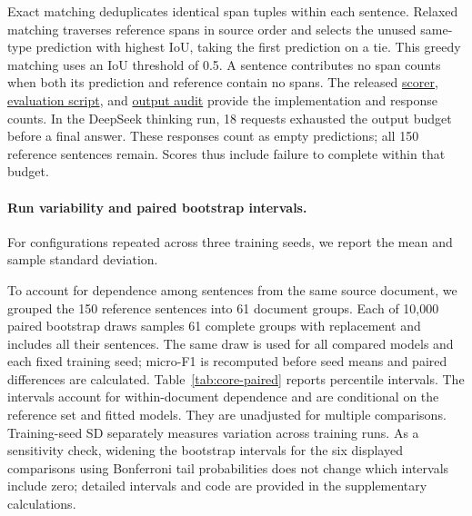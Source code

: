 Exact matching deduplicates identical span tuples within each sentence. Relaxed matching traverses reference spans in source order and selects the unused same-type prediction with highest IoU, taking the first prediction on a tie. This greedy matching uses an IoU threshold of 0.5. A sentence contributes no span counts when both its prediction and reference contain no spans. The released \href{https://github.com/AlfredJamesLi/chinese-skillspan-benchmark/blob/e3f0aa87f65cdfcb399b0c9f305bb7666a76d3b6/scorer/score_lskt.py}{scorer}, \href{https://github.com/AlfredJamesLi/chinese-skillspan-benchmark/blob/e3f0aa87f65cdfcb399b0c9f305bb7666a76d3b6/scripts/eval_gold150_ext.py}{evaluation script}, and \href{https://github.com/AlfredJamesLi/chinese-skillspan-benchmark/tree/main/reproduction/reviewer_revision_20261005}{output audit} provide the implementation and response counts. In the DeepSeek thinking run, 18 requests exhausted the output budget before a final answer. These responses count as empty predictions; all 150 reference sentences remain. Scores thus include failure to complete within that budget.

\paragraph{Run variability and paired bootstrap intervals.}
For configurations repeated across three training seeds, we report the mean and sample standard deviation.

To account for dependence among sentences from the same source document, we grouped the 150 reference sentences into 61 document groups. Each of 10,000 paired bootstrap draws samples 61 complete groups with replacement and includes all their sentences. The same draw is used for all compared models and each fixed training seed; micro-F1 is recomputed before seed means and paired differences are calculated. Table~\ref{tab:core-paired} reports percentile intervals. The intervals account for within-document dependence and are conditional on the reference set and fitted models. They are unadjusted for multiple comparisons. Training-seed SD separately measures variation across training runs. As a sensitivity check, widening the bootstrap intervals for the six displayed comparisons using Bonferroni tail probabilities does not change which intervals include zero; detailed intervals and code are provided in the supplementary calculations.

